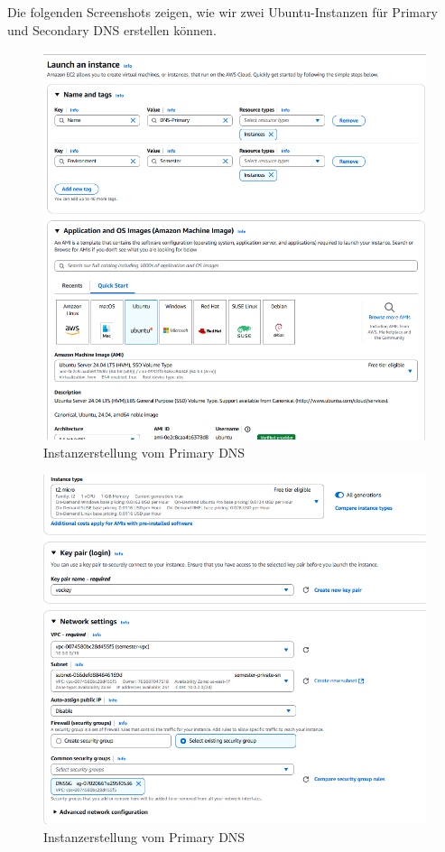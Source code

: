 \documentclass[a4paper,12pt]{article}
\begin{document}
Die folgenden Screenshots zeigen, wie wir zwei Ubuntu-Instanzen für Primary und Secondary DNS erstellen können.

\begin{figure}[H]
	\centering
	\includegraphics[width=\textwidth]{data/Launch_Instance_DNS_Primary.png}
	\caption{Instanzerstellung vom Primary DNS}
	\label{fig:Instanzecreation vom Primary DNS}
\end{figure}

\begin{figure}[H]
	\centering
	\includegraphics[width=\textwidth]{data/Launch_Instance_DNS_Primary2.png}
	\caption{Instanzerstellung vom Primary DNS}
	\label{fig:Instanzecreation vom Primary DNS2}
\end{figure}
\end{document}
